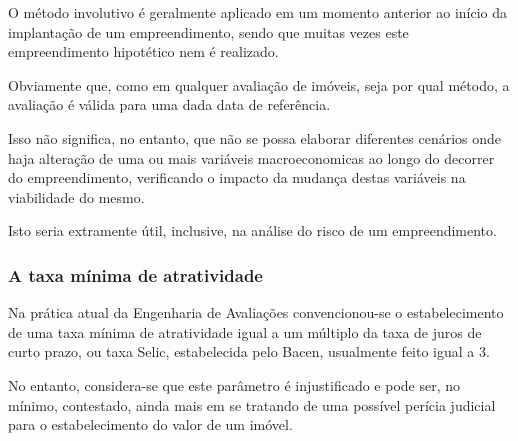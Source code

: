 \documentclass[
	12pt,				%
	oneside,			%
	a4paper,			%
	chapter=TITLE,		%
	section=TITLE,		%
	english,			%
	brazil				%
	]{abntex2}
\begin{document}
O método involutivo é geralmente aplicado em um momento anterior ao
início da implantação de um empreendimento, sendo que muitas vezes este
empreendimento hipotético nem é realizado.

Obviamente que, como em qualquer avaliação de imóveis, seja por qual
método, a avaliação é válida para uma dada data de referência.

Isso não significa, no entanto, que não se possa elaborar diferentes
cenários onde haja alteração de uma ou mais variáveis macroeconomicas ao
longo do decorrer do empreendimento, verificando o impacto da mudança
destas variáveis na viabilidade do mesmo.

Isto seria extramente útil, inclusive, na análise do risco de um
empreendimento.

\subsubsection{A taxa mínima de
atratividade}\label{a-taxa-muxednima-de-atratividade}

Na prática atual da Engenharia de Avaliações convencionou-se o
estabelecimento de uma taxa mínima de atratividade igual a um múltiplo
da taxa de juros de curto prazo, ou taxa Selic, estabelecida pelo
\gls{Bacen}, usualmente feito igual a 3.

No entanto, considera-se que este parâmetro é injustificado e pode ser,
no mínimo, contestado, ainda mais em se tratando de uma possível perícia
judicial para o estabelecimento do valor de um imóvel.
\end{document}
